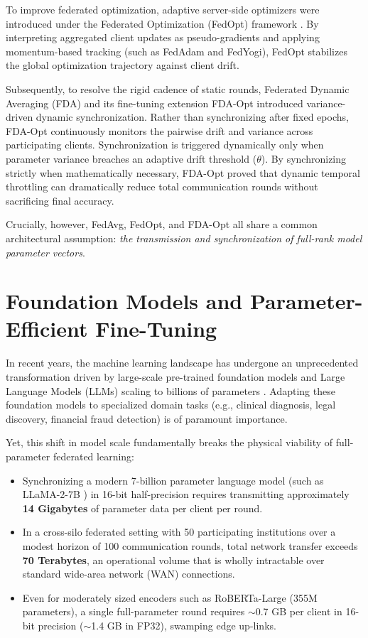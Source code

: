 To improve federated optimization, adaptive server-side optimizers were introduced under the Federated Optimization (FedOpt) framework \cite{reddi2021adaptive}. By interpreting aggregated client updates as pseudo-gradients and applying momentum-based tracking (such as FedAdam and FedYogi), FedOpt stabilizes the global optimization trajectory against client drift. 

Subsequently, to resolve the rigid cadence of static rounds, Federated Dynamic Averaging (FDA) \cite{theologitis2025communication} and its fine-tuning extension FDA-Opt \cite{theologitis2025fda} introduced variance-driven dynamic synchronization. Rather than synchronizing after fixed epochs, FDA-Opt continuously monitors the pairwise drift and variance across participating clients. Synchronization is triggered dynamically only when parameter variance breaches an adaptive drift threshold ($\theta$). By synchronizing strictly when mathematically necessary, FDA-Opt proved that dynamic temporal throttling can dramatically reduce total communication rounds without sacrificing final accuracy.

Crucially, however, FedAvg, FedOpt, and FDA-Opt all share a common architectural assumption: \emph{the transmission and synchronization of full-rank model parameter vectors}.

\section{Foundation Models and Parameter-Efficient Fine-Tuning}
\label{sec:intro-foundation-peft}
In recent years, the machine learning landscape has undergone an unprecedented transformation driven by large-scale pre-trained foundation models and Large Language Models (LLMs) scaling to billions of parameters \cite{brown2020language, bommasani2021opportunities}. Adapting these foundation models to specialized domain tasks (e.g., clinical diagnosis, legal discovery, financial fraud detection) is of paramount importance.

Yet, this shift in model scale fundamentally breaks the physical viability of full-parameter federated learning:
\begin{itemize}
    \item Synchronizing a modern 7-billion parameter language model (such as LLaMA-2-7B \cite{touvron2023llama}) in 16-bit half-precision requires transmitting approximately \textbf{14 Gigabytes} of parameter data per client per round.
    \item In a cross-silo federated setting with 50 participating institutions over a modest horizon of 100 communication rounds, total network transfer exceeds \textbf{70 Terabytes}, an operational volume that is wholly intractable over standard wide-area network (WAN) connections.
    \item Even for moderately sized encoders such as RoBERTa-Large \cite{liu2019roberta} (355M parameters), a single full-parameter round requires $\sim$0.7 GB per client in 16-bit precision ($\sim$1.4 GB in FP32), swamping edge up-links.
\end{itemize}

